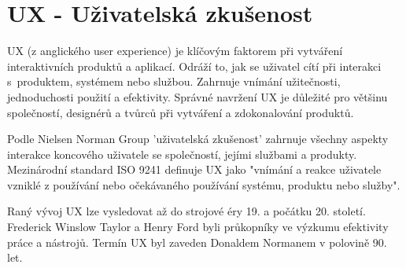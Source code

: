 \section{UX - Uživatelská zkušenost}
UX (z anglického user experience) je klíčovým faktorem při vytváření interaktivních produktů a aplikací. Odráží to, jak se uživatel cítí při interakci s~produktem, systémem nebo službou. Zahrnuje vnímání užitečnosti, jednoduchosti použití a efektivity. Správné navržení UX je důležité pro většinu společností, designérů a tvůrců při vytváření a zdokonalování produktů.

Podle Nielsen Norman Group 'uživatelská zkušenost' zahrnuje všechny aspekty interakce koncového uživatele se společností, jejími službami a produkty. Mezinárodní standard ISO 9241 definuje UX jako "vnímání a reakce uživatele vzniklé z používání nebo očekávaného používání systému, produktu nebo služby". \cite{iso9241}

Raný vývoj UX lze vysledovat až do strojové éry 19. a počátku 20. století. Frederick Winslow Taylor a Henry Ford byli průkopníky ve výzkumu efektivity práce a nástrojů. Termín UX byl zaveden Donaldem Normanem v polovině 90. let. \cite{nngroup}
